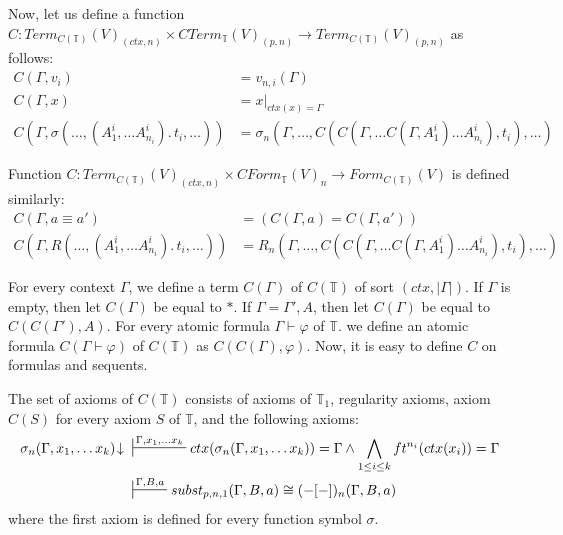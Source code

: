 \documentclass[reqno]{amsart}
\theoremstyle{definition}
\theoremstyle{remark}
\newcommand{\deq}{\equiv}
\numberwithin{figure}{section}
\begin{document}
Now, let us define a function $C : Term_{C(\mathbb{T})}(V)_{(ctx,n)} \times CTerm_\mathbb{T}(V)_{(p,n)} \to Term_{C(\mathbb{T})}(V)_{(p,n)}$ as follows:
\begin{align*}
C(\Gamma, v_i) & = v_{n,i}(\Gamma) \\
C(\Gamma, x) & = x|_{ctx(x) = \Gamma} \\
C(\Gamma, \sigma(\ldots, (A^i_1, \ldots A^i_{n_i}).\,t_i, \ldots)) & = \sigma_n(\Gamma, \ldots, C(C(\Gamma, \ldots C(\Gamma, A^i_1) \ldots A^i_{n_i}), t_i), \ldots)
\end{align*}

Function $C : Term_{C(\mathbb{T})}(V)_{(ctx,n)} \times CForm_\mathbb{T}(V)_n \to Form_{C(\mathbb{T})}(V)$ is defined similarly:
\begin{align*}
C(\Gamma, a \deq a') & = (C(\Gamma, a) = C(\Gamma, a')) \\
C(\Gamma, R(\ldots, (A^i_1, \ldots A^i_{n_i}).\,t_i, \ldots)) & = R_n(\Gamma, \ldots, C(C(\Gamma, \ldots C(\Gamma, A^i_1) \ldots A^i_{n_i}), t_i), \ldots)
\end{align*}

For every context $\Gamma$, we define a term $C(\Gamma)$ of $C(\mathbb{T})$ of sort $(ctx,|\Gamma|)$.
If $\Gamma$ is empty, then let $C(\Gamma)$ be equal to $*$.
If $\Gamma = \Gamma', A$, then let $C(\Gamma)$ be equal to $C(C(\Gamma'), A)$.
For every atomic formula $\Gamma \vdash \varphi$ of $\mathbb{T}$. we define an atomic formula $C(\Gamma \vdash \varphi)$ of $C(\mathbb{T})$ as $C(C(\Gamma), \varphi)$.
Now, it is easy to define $C$ on formulas and sequents.

The set of axioms of $C(\mathbb{T})$ consists of axioms of $\mathbb{T}_1$, regularity axioms, axiom $C(S)$ for every axiom $S$ of $\mathbb{T}$, and the following axioms:
\begin{align*}
\sigma_n(\Gamma, x_1, \ldots x_k)\!\downarrow\ & \sststile{}{\Gamma, x_1, \ldots x_k} ctx(\sigma_n(\Gamma, x_1, \ldots x_k)) = \Gamma \land \bigwedge_{1 \leq i \leq k} ft^{n_i}(ctx(x_i)) = \Gamma \\
& \sststile{}{\Gamma, B, a} subst_{p,n,1}(\Gamma, B, a) \cong (-[-])_n(\Gamma, B, a)
\end{align*}
where the first axiom is defined for every function symbol $\sigma$.
\end{document}
